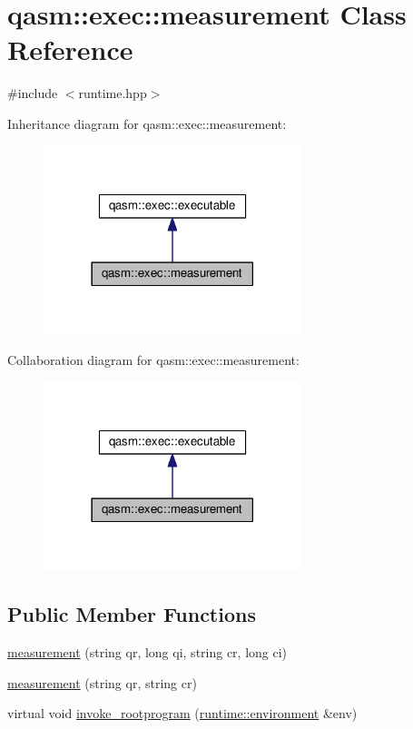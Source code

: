 \hypertarget{classqasm_1_1exec_1_1measurement}{}\section{qasm\+:\+:exec\+:\+:measurement Class Reference}
\label{classqasm_1_1exec_1_1measurement}


{\ttfamily \#include $<$runtime.\+hpp$>$}



Inheritance diagram for qasm\+:\+:exec\+:\+:measurement\+:\nopagebreak
\begin{figure}[H]
\begin{center}
\leavevmode
\includegraphics[width=213pt]{classqasm_1_1exec_1_1measurement__inherit__graph}
\end{center}
\end{figure}


Collaboration diagram for qasm\+:\+:exec\+:\+:measurement\+:\nopagebreak
\begin{figure}[H]
\begin{center}
\leavevmode
\includegraphics[width=213pt]{classqasm_1_1exec_1_1measurement__coll__graph}
\end{center}
\end{figure}
\subsection*{Public Member Functions}
\begin{DoxyCompactItemize}
\item 
\hyperlink{classqasm_1_1exec_1_1measurement_aea704a014c6ae33420021ec54ab6447b}{measurement} (string qr, long qi, string cr, long ci)
\item 
\hyperlink{classqasm_1_1exec_1_1measurement_a82af9b0d6dea17bd770e8c6e6b5d2fb8}{measurement} (string qr, string cr)
\item 
virtual void \hyperlink{classqasm_1_1exec_1_1measurement_aefa96cf86f31c40a75fbc46924c94bb8}{invoke\+\_\+rootprogram} (\hyperlink{classqasm_1_1runtime_1_1environment}{runtime\+::environment} \&env)
\end{DoxyCompactItemize}
